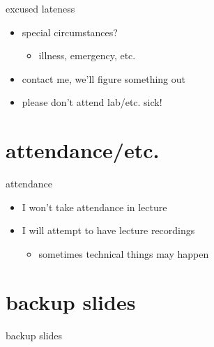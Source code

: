\begin{frame}{excused lateness}
    \begin{itemize}
    \item special circumstances?
        \begin{itemize}
        \item illness, emergency, etc.
        \end{itemize}
    \item contact me, we'll figure something out
    \vspace{.5cm}
    \item please don't attend lab/etc. sick!
    \end{itemize}
\end{frame}

\section{attendance/etc.}

\begin{frame}{attendance}
    \begin{itemize}
    \item I won't take attendance in lecture
    \item I will attempt to have lecture recordings
        \begin{itemize}
        \item sometimes technical things may happen
        \end{itemize}
    \end{itemize}
\end{frame}




\section{backup slides}
\begin{frame}{backup slides}
\end{frame}


